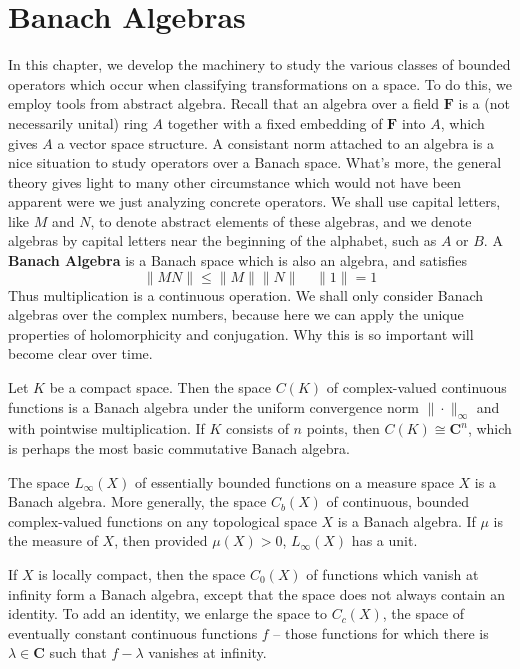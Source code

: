 \chapter{Banach Algebras}

In this chapter, we develop the machinery to study the various classes of bounded operators which occur when classifying transformations on a space. To do this, we employ tools from abstract algebra. Recall that an algebra over a field $\mathbf{F}$ is a (not necessarily unital) ring $A$ together with a fixed embedding of $\mathbf{F}$ into $A$, which gives $A$ a vector space structure. A consistant norm attached to an algebra is a nice situation to study operators over a Banach space. What's more, the general theory gives light to many other circumstance  which would not have been apparent were we just analyzing concrete operators. We shall use capital letters, like $M$ and $N$, to denote abstract elements of these algebras, and we denote algebras by capital letters near the beginning of the alphabet, such as $A$ or $B$. A {\bf Banach Algebra} is a Banach space which is also an algebra, and satisfies
%
\begin{equation} \label{algebranorm} \| MN \| \leq \| M \| \| N \|\ \ \ \ \ \| 1 \| = 1 \end{equation}
%
Thus multiplication is a continuous operation. We shall only consider Banach algebras over the complex numbers, because here we can apply the unique properties of holomorphicity and conjugation. Why this is so important will become clear over time.

\begin{example}
    Let $K$ be a compact space. Then the space $C(K)$ of complex-valued continuous functions is a Banach algebra under the uniform convergence norm $\| \cdot \|_\infty$ and with pointwise multiplication. If $K$ consists of $n$ points, then $C(K) \cong \mathbf{C}^n$, which is perhaps the most basic commutative Banach algebra.
\end{example}

\begin{example}
    The space $L_\infty(X)$ of essentially bounded functions on a measure space $X$ is a Banach algebra. More generally, the space $C_b(X)$ of continuous, bounded complex-valued functions on any topological space $X$ is a Banach algebra. If $\mu$ is the measure of $X$, then provided $\mu(X) > 0$, $L_\infty(X)$ has a unit.
\end{example}

\begin{example}
    If $X$ is locally compact, then the space $C_0(X)$ of functions which vanish at infinity form a Banach algebra, except that the space does not always contain an identity. To add an identity, we enlarge the space to $C_c(X)$, the space of eventually constant continuous functions $f$ -- those functions for which there is $\lambda \in \mathbf{C}$ such that $f - \lambda$ vanishes at infinity.
\end{example}

